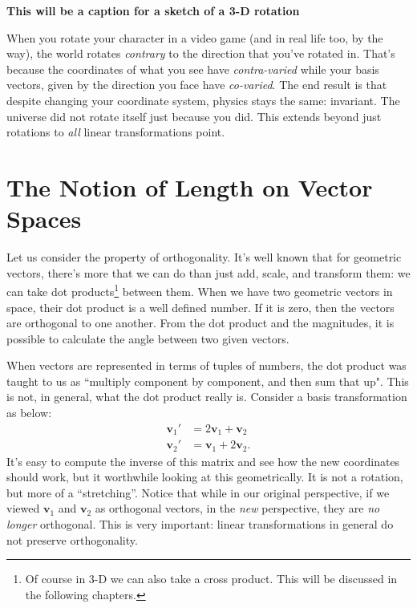 \documentclass[../master.tex]{subfiles}
\begin{document}
	\textbf{This will be a caption for a sketch of a 3-D rotation}
	
	 When you rotate your character in a video game (and in real life too, by the way), the world rotates \emph{contrary} to the direction that you've rotated in. That's because the coordinates of what you see have \emph{contra-varied} while your basis vectors, given by the direction you face have \emph{co-varied}. The end result is that despite changing your coordinate system, physics stays the same: invariant. The universe did not rotate itself just because you did. This extends beyond just rotations to \emph{all} linear transformations point. \\
	
	
	\section{The Notion of Length on Vector Spaces} %
	\label{sec:the_notion_of_length_on_vector_spaces}
	
	Let us consider the property of orthogonality. It's well known that for geometric vectors, there's more that we can do than just add, scale, and transform them: we can take dot products\footnote{Of course in 3-D we can also take a cross product. This will be discussed in the following chapters.} between them. When we have two geometric vectors in space, their dot product is a well defined number. If it is zero, then the vectors are orthogonal to one another. From the dot product and the magnitudes, it is possible to calculate the angle between two given vectors. 
	
	When vectors are represented in terms of tuples of numbers, the dot product was taught to us as ``multiply component by component, and then sum that up". This is not, in general, what the dot product really is. Consider a basis transformation as below:
	\begin{align*}
		\mathbf v_1' &= 2 \mathbf v_1 + \mathbf v_2 \\
		\mathbf v_2' &=  \mathbf v_1 + 2 \mathbf v_2.
	\end{align*}
	It's easy to compute the inverse of this matrix and see how the new coordinates should work, but it worthwhile looking at this geometrically. It is not a rotation, but more of a ``stretching''. Notice that while in our original perspective, if we viewed $\mathbf v_1$ and $\mathbf v_2$ as orthogonal vectors, in the \emph{new} perspective, they are \emph{no longer} orthogonal. This is very important: linear transformations in general do not preserve orthogonality.
	
\end{document}
